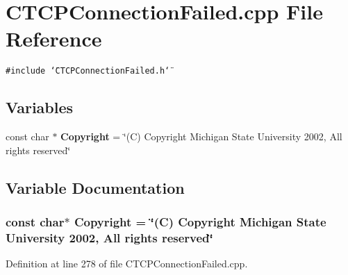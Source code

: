 \section{CTCPConnection\-Failed.cpp File Reference}
\label{CTCPConnectionFailed_8cpp}
{\tt \#include \char`\"{}CTCPConnection\-Failed.h\char`\"{}}\par
\subsection*{Variables}
\begin{CompactItemize}
\item 
const char $\ast$ {\bf Copyright} = \char`\"{}(C) Copyright Michigan State University 2002, All rights reserved\char`\"{}
\end{CompactItemize}


\subsection{Variable Documentation}
\subsubsection{\setlength{\rightskip}{0pt plus 5cm}const char$\ast$ Copyright = \char`\"{}(C) Copyright Michigan State University 2002, All rights reserved\char`\"{}\hspace{0.3cm}{\tt  [static]}}\label{CTCPConnectionFailed_8cpp_a0}




Definition at line 278 of file CTCPConnection\-Failed.cpp.